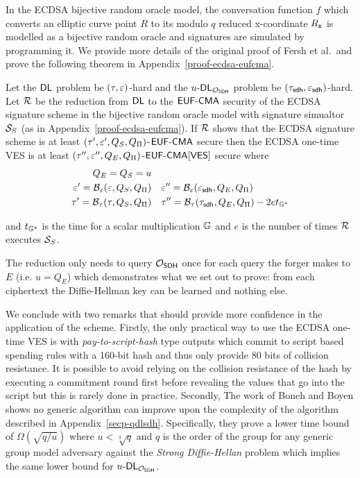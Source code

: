 In the ECDSA bijective random oracle model, the conversation function $f$ which converts an elliptic curve point $R$ to its modulo $q$ reduced x-coordinate $R_{\mathtt{x}}$ is modelled as a bijective random oracle and signatures are simulated by programming it.
We provide more details of the original proof of Fersh et al.\ and prove the following theorem in Appendix~\ref{proof-ecdsa-eufcma}.

\begin{theorem}
  Let the $\textsf{DL}$ problem be $(\tau, \varepsilon)$-hard and the $u\text{-}\textsf{DL}_{\mathcal{O}_{\textsf{SDH}}}$ problem be $(\tau_{\textsf{sdh}},\varepsilon_{\textsf{sdh}})$-hard.
  Let $\mathcal{R}$ be the reduction from $\textsf{DL}$ to the $\textsf{EUF-CMA}$ security of the ECDSA signature scheme in the bijective random oracle model with signature simualtor $\mathcal{S}_S$ (as in Appendix~\ref{proof-ecdsa-eufcma}).
  If $\mathcal{R}$ shows that the ECDSA signature scheme is at least $(\tau',\varepsilon',Q_S,Q_{\Pi})$-$\textsf{EUF-CMA}$ secure then the ECDSA one-time VES is at least $(\tau'',\varepsilon'',Q_E,Q_{\Pi})$-$\textsf{EUF-CMA}[\textsf{VES}]$ secure where
  \begin{align*}
    Q_E =  Q_S = u &&& \\
    \varepsilon'   =    \mathcal{B}_\varepsilon(\varepsilon, Q_S, Q_{\Pi})  & & & \varepsilon''  = \mathcal{B}_\varepsilon(\varepsilon_{\textsf{sdh}}, Q_E, Q_{\Pi}) \\
    \tau' =  \mathcal{B}_\tau(\tau,Q_S, Q_{\Pi})  & & & \tau'' = \mathcal{B}_\tau(\tau_{\textsf{sdh}},Q_E, Q_{\Pi}) -  2et_{\mathbb{G}^*}
  \end{align*}

  \hfill \break and $t_{\mathbb{G}^*}$ is the time for a scalar multiplication  $\mathbb{G}$ and $e$ is the number of times $\mathcal{R}$ executes $\mathcal{S}_S$.
\end{theorem}

The reduction only needs to query $\mathcal{O}_{\textsf{SDH}}$ once for each query the forger makes to $E$ (i.e. $u = Q_E$) which demonstrates what we set out to prove: from each ciphertext the Diffie-Hellman key can be learned and nothing else.

We conclude with two remarks that should provide more confidence in the application of the scheme.
Firstly, the only practical way to use the ECDSA one-time VES is with \emph{pay-to-script-hash} type outputs which commit to script based spending rules with a 160-bit hash and thus only provide 80 bits of collision resistance.
It is possible to avoid relying on the collision resistance of the hash by executing a commitment round first before revealing the values that go into the script but this is rarely done in practice.
Secondly, The work of Boneh and Boyen \cite{BBSig} shows no generic algorithm can improve upon the complexity of the algorithm described in Appendix~\ref{secp-qdlsdh}.
Specifically, they prove a lower time bound of $\Omega(\sqrt{q/u})$  where $u < \sqrt[3]{q}$ and $q$ is the order of the group for any generic group model adversary against the \emph{Strong Diffie-Hellan} problem which implies the same lower bound for $u\text{-}\textsf{DL}_{\mathcal{O}_{\textsf{SDH}}}$.
